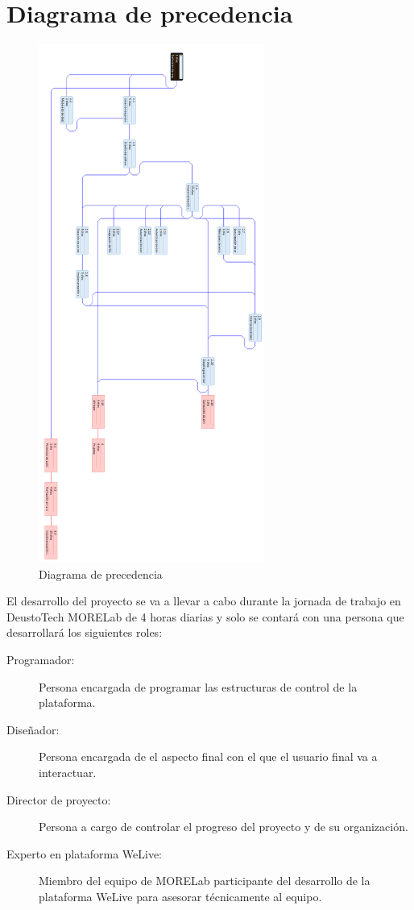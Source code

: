 \documentclass{DeustoFDP}
\begin{document}
\section{Diagrama de precedencia}
\begin{figure}[H]
	\centering
	\includegraphics[width=210pt]{fig/precedencia}
	\caption{Diagrama de precedencia}\label{fig:precedencia}
\end{figure}

El desarrollo del proyecto se va a llevar a cabo durante la jornada de trabajo en DeustoTech MORELab de 4 horas diarias y solo se contará con una persona que desarrollará los siguientes roles:

\begin{description}
	\item[Programador:] Persona encargada de programar las estructuras de control de la plataforma.
	\item[Diseñador:] Persona encargada de el aspecto final con el que el usuario final va a interactuar.
	\item[Director de proyecto:] Persona a cargo de controlar el progreso del proyecto y de su organización.
	\item[Experto en plataforma WeLive:] Miembro del equipo de MORELab participante del desarrollo de la plataforma WeLive para asesorar técnicamente al equipo.
\end{description}
\end{document}

